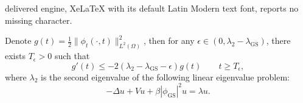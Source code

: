 \documentclass[10pt,a4paper]{amsart}
\begin{document}
delivered engine, XeLaTeX with its default Latin Modern text font, reports no missing character.
\begin{lemma}\label{lem: key lemma}
Denote $g(t) = \frac12\|\phi_t(\cdot,t) \|_{L^2(\Omega)}^2$, then for any $\epsilon \in (0, \lambda_2 - \lambda_{\mathrm{GS}})$, there exists $T_{\epsilon} > 0$ such that 
	\begin{equation}\label{equ: key inequality}
		g'(t) \le - 2(\lambda_2 - \lambda_{\text{GS}} - \epsilon) g(t) \qquad t \ge T_{\epsilon},
	\end{equation}
	where $\lambda_2$ is the second eigenvalue of the following linear eigenvalue problem: 
	\begin{equation*}
		- \Delta u + V u + \beta |\phi_{\text{GS}}|^2 u = \lambda u.
	\end{equation*}
\end{lemma}
\end{document}
